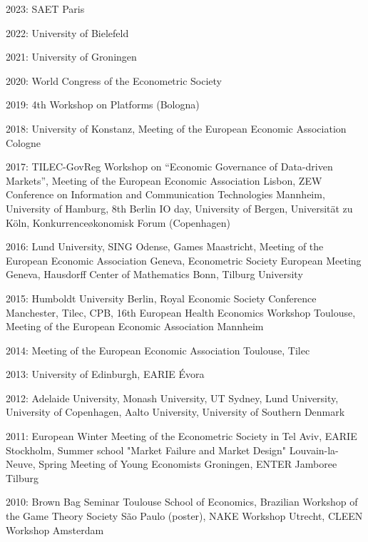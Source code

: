 \documentclass[a4paper]{article}
\renewenvironment{itemize}{
  \begin{list}{}{
    \setlength{\leftmargin}{1.5em}
  }
}{
  \end{list}
}
\begin{document}
\begin{itemize}
  \item 2023: SAET Paris
  \item 2022: University of Bielefeld
  \item 2021: University of Groningen
  \item 2020: World Congress of the Econometric Society
  \item 2019: 4th Workshop on Platforms (Bologna)
  \item 2018: University of Konstanz, Meeting of the European Economic Association Cologne
\item 2017: TILEC-GovReg Workshop on ``Economic Governance of Data-driven Markets'', Meeting of the European Economic Association Lisbon, ZEW Conference on Information and Communication Technologies Mannheim, University of Hamburg, 8th Berlin IO day, University of Bergen, Universit\"at zu K\"oln, Konkurrence\o konomisk Forum (Copenhagen)  
\item 2016: Lund University, SING Odense, Games Maastricht, Meeting of the European Economic Association Geneva, Econometric Society European Meeting Geneva, Hausdorff Center of Mathematics Bonn, Tilburg University
\item 2015: Humboldt University Berlin, Royal Economic Society Conference Manchester, Tilec, CPB, 16th European Health Economics Workshop Toulouse, Meeting of the European Economic Association Mannheim 
\item 2014: Meeting of the European Economic Association Toulouse, Tilec 
\item 2013: University of Edinburgh, EARIE \'{E}vora 
\item 2012: Adelaide University, Monash University, UT Sydney, Lund
  University, University of Copenhagen, Aalto University,
  University of  Southern Denmark
\item  2011: European Winter Meeting of the Econometric Society in Tel
  Aviv, EARIE Stockholm, Summer school "Market Failure and Market
  Design" Louvain-la-Neuve, Spring Meeting of Young Economists
  Groningen, ENTER Jamboree
  Tilburg
\item  2010: Brown Bag Seminar Toulouse School of Economics, Brazilian
  Workshop of the Game Theory Society S\~{a}o Paulo (poster), NAKE Workshop
  Utrecht, CLEEN Workshop Amsterdam
\end{itemize}
\end{document}

